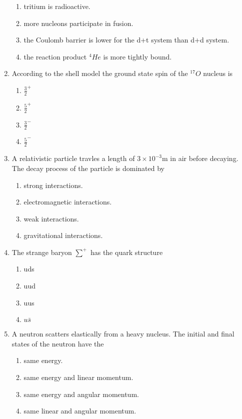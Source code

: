\documentclass[journal]{IEEEtran}
\numberwithin{equation}{enumi}
\numberwithin{figure}{enumi}
\begin{document}
\begin{enumerate}
		\begin{enumerate}
			\item tritium is radioactive.
			\item more nucleons participate in fusion.
			\item the Coulomb barrier is lower for the d+t system than d+d system.
			\item the reaction product $^4He$ is more tightly bound.
		\end{enumerate}
	\item According to the shell model the ground state spin of the $^{17}O$ nucleus is
		\begin{enumerate}
			\item $\frac{3}{2}^+$
			\item $\frac{5}{2}^+$
			\item $\frac{3}{2}^-$
			\item $\frac{5}{2}^-$
		\end{enumerate}
	\item A relativistic particle travles a length of $3\times10^{-3}$m in air before decaying. The decay process of the particle is dominated by
		\begin{enumerate}
			\item strong interactions.
			\item electromagnetic interactions.
			\item weak interactions.
			\item gravitational interactions.
		\end{enumerate}
	\item The strange baryon $\sum^+$ has the quark structure
		\begin{enumerate}
			\item uds
			\item uud
			\item uus
			\item $u\bar{s}$
		\end{enumerate}
	\item A neutron scatters elastically from a heavy nucleus. The initial and final states of the neutron have the
		\begin{enumerate}
			\item same energy.
			\item same energy and linear momentum.
			\item same energy and angular momentum.
			\item same linear and angular momentum.
		\end{enumerate}

\end{enumerate}
\end{document}
